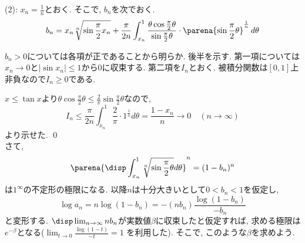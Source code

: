 (2): $x_n = \frac{1}{n}$とおく.
{\small
{}
}
そこで, $b_n$を次でおく.
\[
b_n = x_n \sqrt[n]{\sin{\frac{\pi}{2}x_n}} + \dfrac{\pi}{2n} \int_{x_n}^{1} \dfrac{\theta\cos{\frac{\pi}{2}\theta}}{\sin{\frac{\pi}{2}\theta}}\cdot \parena{\sin{\frac{\pi}{2}\theta}}^{\frac{1}{n}} \, d\theta
\]
\begin{prf}
$b_n > 0$については各項が正であることから明らか. 後半を示す.
第一項については$x_n\to 0$と$|\sin{x_n}|\leq 1$から0に収束する. 第二項を$I_n$とおく. 被積分関数は$[0,1]$上非負なので$I_n \geq 0$である.
\end{prf}
$x \leq \tan{x}$より$\theta\cos{\frac{\pi}{2}\theta}\leq \frac{2}{\pi}\sin{\frac{\pi}{2}\theta}$なので,
\[
I_n \leq \dfrac{\pi}{2n} \int_{x_n}^{1} \frac{2}{\pi} \cdot 1^{\frac{1}{n}} d\theta = \dfrac{1 - x_n}{n} \to 0\quad (n\to \infty)
\]
より示せた. \qed \\
さて,
\[
\parena{\disp\int_{x_n}^{1} \sqrt[n]{\sin{\frac{\pi}{2}\theta}}d\theta}^{n} =  (1 - b_n)^n
\]
は$1^{\infty}$の不定形の極限になる. 以降$n$は十分大きいとして$0 < b_n < 1$を仮定し,
\[
\log{a_n} = n\log{(1-b_n)} = -(nb_n) \dfrac{\log{(1-b_n)}}{-b_n}
\]
と変形する. $\disp\lim_{n\to \infty} nb_n$が実数値$\beta$に収束したと仮定すれば, 求める極限は$e^{-\beta}$となる($\lim_{t\to 0}\frac{\log{(1-t)}}{-t} = 1$  を利用した). そこで, このような$\beta$を求めよう.
